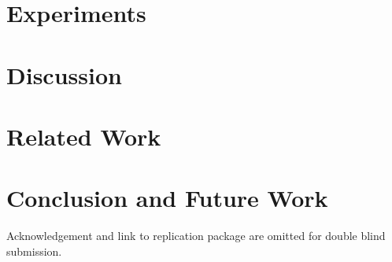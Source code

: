 \documentclass[sigconf]{acmart}
\begin{document}
\section{Experiments}\label{sec.exp}


\section{Discussion}\label{sec.discuss}


\section{Related Work}\label{sec.related}


\section{Conclusion and Future Work}\label{sec.conclusion}


\vspace{0.2cm} Acknowledgement and link to replication package are omitted for double blind submission.

\pagebreak
\balance


\end{document}
